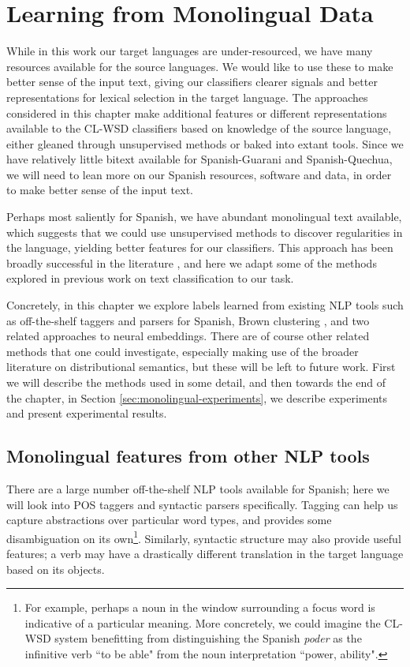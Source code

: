 \chapter{Learning from Monolingual Data}
\label{chap:monolingual}
While in this work our target languages are under-resourced, we have many
resources available for the source languages. We would like to use these to
make better sense of the input text, giving our classifiers clearer signals and
better representations for lexical selection in the target language. The
approaches considered in this chapter make additional features or different
representations available to the CL-WSD classifiers based on knowledge of the
source language, either gleaned through unsupervised methods or baked into
extant tools. Since we have relatively little bitext available for
Spanish-Guarani and Spanish-Quechua, we will need to lean more on our Spanish
resources, software and data, in order to make better sense of the input text.

Perhaps most saliently for Spanish, we have abundant monolingual text
available, which suggests that we could use unsupervised methods to discover
regularities in the language, yielding better features for our classifiers.
This approach has been broadly successful in the literature
\cite{turian-ratinov-bengio:2010:ACL,baroni2014don}, and here we adapt some of
the methods explored in previous work on text classification to our task.

Concretely, in this chapter we explore labels learned from existing NLP tools
such as off-the-shelf taggers and parsers for Spanish, Brown clustering
\cite{brown1992class}, and two related approaches to neural embeddings. There
are of course other related methods that one could investigate, especially
making use of the broader literature on distributional semantics, but these
will be left to future work. First we will describe the methods used in some
detail, and then towards the end of the chapter, in Section
\ref{sec:monolingual-experiments}, we describe experiments and present
experimental results.

\section{Monolingual features from other NLP tools}
There are a large number off-the-shelf NLP tools available for Spanish; here we
will look into POS taggers and syntactic parsers specifically. Tagging can help
us capture abstractions over particular word types, and provides some
disambiguation on its own\footnote{For example, perhaps a noun in the window
surrounding a focus word is indicative of a particular meaning. More
concretely, we could imagine the CL-WSD system benefitting from distinguishing
the Spanish \emph{poder} as the infinitive verb ``to be able" from the noun
interpretation ``power, ability".}. Similarly, syntactic structure may also
provide useful features; a verb may have a drastically different translation
in the target language based on its objects.

